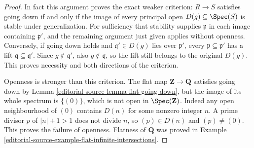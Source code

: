 \begin{proof}
In fact this argument proves the exact weaker criterion:
$R\to S$ satisfies going down if and only if the image
of every principal open $D(g)\subseteq\Spec(S)$ is stable
under generalization. For sufficiency that stability
supplies $\mathfrak p$ in each image containing
$\mathfrak p'$, and the remaining argument just given
applies without openness. Conversely, if going down
holds and $\mathfrak q'\in D(g)$ lies over
$\mathfrak p'$, every $\mathfrak p\subseteq\mathfrak p'$
has a lift $\mathfrak q\subseteq\mathfrak q'$.
Since $g\notin\mathfrak q'$, also $g\notin\mathfrak q$,
so the lift still belongs to the original $D(g)$.
This proves necessity and both directions of the criterion.

Openness is stronger than this criterion. The flat map
$\mathbf Z\to\mathbf Q$ satisfies going down by
Lemma \ref{editorial-source-lemma-flat-going-down}, but the image of its
whole spectrum is $\{(0)\}$, which is not open in
$\Spec(\mathbf Z)$. Indeed any open neighbourhood of
$(0)$ contains $D(n)$ for some nonzero integer $n$.
A prime divisor $p$ of $|n|+1>1$ does not divide $n$,
so $(p)\in D(n)$ and $(p)\ne(0)$. This proves the
failure of openness. Flatness of $\mathbf Q$ was proved
in Example \ref{editorial-source-example-flat-infinite-intersections}.
\end{proof}